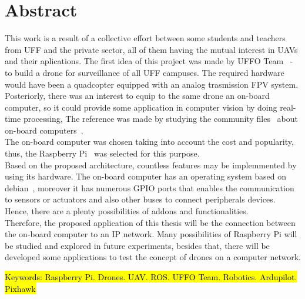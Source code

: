 \documentclass[12pt,a4paper,oneside]{book}
\begin{document}



\chapter*{Abstract}
%
%
\thispagestyle{myheadings}
%
This work is a result of a collective effort between some students and teachers from UFF and the private sector, all of them having the mutual interest in UAVs and  their aplications. The first idea of this project was made by UFFO Team~\cite{url:equipeuffo} - to build a drone for surveillance of all UFF campuses. The required hardware would have been a quadcopter equipped with an analog trasmission FPV system. Posteriorly, there was an interest to equip to the same drone an on-board computer, so it could provide some application in computer vision by doing real-time processing, The reference was made by studying the community files~\cite{url:ardupilotdoc} about on-board computers~\cite{url:ardupilot-companioncomputers}.\\
%
The on-board computer was chosen taking into account the cost and popularity, thus, the Raspberry Pi~\cite{url:raspberrypi} was selected for this purpose.\\
%
Based on the proposed architecture, countless features may be implemmented by using its hardware. The on-board computer has an operating system based on debian~\cite{url:debian}, moreover it has numerous GPIO ports that enables the communication to sensors or actuators and also other buses to connect peripherals devices. Hence, there are a plenty possibilities of addons and functionalities.\\ 
%
Therefore, the proposed application of this thesis will be the connection between the on-board computer to an IP network. Many possibilities of Raspberry Pi will be studied and explored in future experiments, besides that, there will be developed some applications to test the concept of drones on a computer network.

\bigskip

\hl{ Keywords: Raspberry Pi. Drones. UAV. ROS. UFFO Team. Robotics. Ardupilot. Pixhawk}

\newpage
\end{document}

